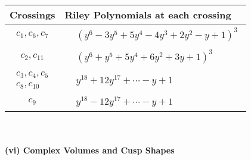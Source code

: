 \documentclass[1p]{elsarticle_modified}
\theoremstyle{definition}
\begin{document}
\begin{tabular}{m{50pt}|m{274pt}}
Crossings & \hspace{64pt}Riley Polynomials at each crossing \\
\hline $$\begin{aligned}c_{1},c_{6},c_{7}\end{aligned}$$&$\begin{aligned}
&(y^6-3 y^5+5 y^4-4 y^3+2 y^2- y+1)^3
\end{aligned}$\\
\hline $$\begin{aligned}c_{2},c_{11}\end{aligned}$$&$\begin{aligned}
&(y^6+y^5+5 y^4+6 y^2+3 y+1)^3
\end{aligned}$\\
\hline $$\begin{aligned}c_{3},c_{4},c_{5}\\c_{8},c_{10}\end{aligned}$$&$\begin{aligned}
&y^{18}+12 y^{17}+\cdots- y+1
\end{aligned}$\\
\hline $$\begin{aligned}c_{9}\end{aligned}$$&$\begin{aligned}
&y^{18}-12 y^{17}+\cdots- y+1
\end{aligned}$\\
\hline
\end{tabular}\\~\\
\newpage\flushleft \textbf{(vi) Complex Volumes and Cusp Shapes}
\end{document}
